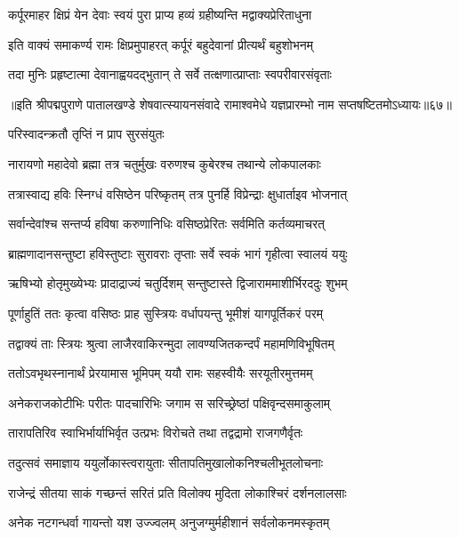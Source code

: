 \twolineshloka
{कर्पूरमाहर क्षिप्रं येन देवाः स्वयं पुरा}
{प्राप्य हव्यं ग्रहीष्यन्ति मद्वाक्यप्रेरिताधुना}%

\twolineshloka
{इति वाक्यं समाकर्ण्य रामः क्षिप्रमुपाहरत्}
{कर्पूरं बहुदेवानां प्रीत्यर्थं बहुशोभनम्}%

\twolineshloka
{तदा मुनिः प्रहृष्टात्मा देवानाह्वयदद्भुतान्}
{ते सर्वे तत्क्षणात्प्राप्ताः स्वपरीवारसंवृताः}%

॥इति श्रीपद्मपुराणे पातालखण्डे शेषवात्स्यायनसंवादे रामाश्वमेधे यज्ञप्रारम्भो नाम सप्तषष्टितमोऽध्यायः॥६७॥



\onelineshloka
{परिस्वादन्क्रतौ तृप्तिं न प्राप सुरसंयुतः}%

\twolineshloka
{नारायणो महादेवो ब्रह्मा तत्र चतुर्मुखः}
{वरुणश्च कुबेरश्च तथान्ये लोकपालकाः}%

\twolineshloka
{तत्रास्वाद्य हविः स्निग्धं वसिष्ठेन परिष्कृतम्}
{तत्र पुनर्हि विप्रेन्द्राः क्षुधार्ताइव भोजनात्}%

\twolineshloka
{सर्वान्देवांश्च सन्तर्प्य हविषा करुणानिधिः}
{वसिष्ठप्रेरितः सर्वमिति कर्तव्यमाचरत्}%

\twolineshloka
{ब्राह्मणादानसन्तुष्टा हविस्तुष्टाः सुरावराः}
{तृप्ताः सर्वे स्वकं भागं गृहीत्वा स्वालयं ययुः}%

\twolineshloka
{ऋषिभ्यो होतृमुख्येभ्यः प्रादाद्राज्यं चतुर्दिशम्}
{सन्तुष्टास्ते द्विजाराममाशीर्भिरददुः शुभम्}%

\twolineshloka
{पूर्णाहुतिं ततः कृत्वा वसिष्ठः प्राह सुस्त्रियः}
{वर्धापयन्तु भूमीशं यागपूर्तिकरं परम्}%

\twolineshloka
{तद्वाक्यं ताः स्त्रियः श्रुत्वा लाजैरवाकिरन्मुदा}
{लावण्यजितकन्दर्पं महामणिविभूषितम्}%

\twolineshloka
{ततोऽवभृथस्नानार्थं प्रेरयामास भूमिपम्}
{ययौ रामः सहस्वीयैः सरयूतीरमुत्तमम्}%

\twolineshloka
{अनेकराजकोटीभिः परीतः पादचारिभिः}
{जगाम स सरिच्छ्रेष्ठां पक्षिवृन्दसमाकुलाम्}%

\twolineshloka
{तारापतिरिव स्वाभिर्भार्याभिर्वृत उत्प्रभः}
{विरोचते तथा तद्वद्रामो राजगणैर्वृतः}%

\twolineshloka
{तदुत्सवं समाज्ञाय ययुर्लोकास्त्वरायुताः}
{सीतापतिमुखालोकनिश्चलीभूतलोचनाः}%

\twolineshloka
{राजेन्द्रं सीतया साकं गच्छन्तं सरितं प्रति}
{विलोक्य मुदिता लोकाश्चिरं दर्शनलालसाः}%

\twolineshloka
{अनेक नटगन्धर्वा गायन्तो यश उज्ज्वलम्}
{अनुजग्मुर्महीशानं सर्वलोकनमस्कृतम्}%

